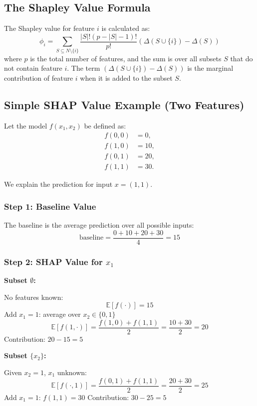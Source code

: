 \documentclass{article}
\begin{document}
\begin{multicols}{2}
\subsection{The Shapley Value Formula}
The Shapley value for feature $i$ is calculated as:
$$ \phi_i = \sum_{S \subseteq N \setminus \{i\}} \frac{|S|!(p - |S| - 1)!}{p!} \left( \Delta(S \cup \{i\}) - \Delta(S) \right) $$
where $p$ is the total number of features, and the sum is over all subsets $S$ that do not contain feature $i$. The term $(\Delta(S \cup \{i\}) - \Delta(S))$ is the marginal contribution of feature $i$ when it is added to the subset $S$.


\subsection{Simple SHAP Value Example (Two Features)}

Let the model \( f(x_1, x_2) \) be defined as:
\[
\begin{aligned}
f(0,0) &= 0, \\
f(1,0) &= 10, \\
f(0,1) &= 20, \\
f(1,1) &= 30.
\end{aligned}
\]

We explain the prediction for input \( x = (1, 1) \).

\subsubsection{Step 1: Baseline Value}

The baseline is the average prediction over all possible inputs:
\[
\text{baseline} = \frac{0 + 10 + 20 + 30}{4} = 15
\]

\subsubsection{Step 2: SHAP Value for \( x_1 \)}

\textbf{Subset \(\emptyset\):}

No features known:  
\[
\mathbb{E}[f(\cdot)] = 15
\]
Add \( x_1 = 1 \): average over \( x_2 \in \{0,1\} \)
\[
\mathbb{E}[f(1, \cdot)] = \frac{f(1,0) + f(1,1)}{2} = \frac{10 + 30}{2} = 20
\]
Contribution: \( 20 - 15 = 5 \)

\medskip
\textbf{Subset \(\{x_2\}\):}

Given \( x_2 = 1 \), \( x_1 \) unknown:
\[
\mathbb{E}[f(\cdot, 1)] = \frac{f(0,1) + f(1,1)}{2} = \frac{20 + 30}{2} = 25
\]
Add \( x_1 = 1 \): \( f(1,1) = 30 \)  
Contribution: \( 30 - 25 = 5 \)


\end{multicols}
\end{document}
